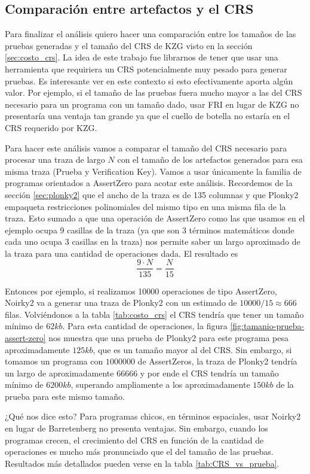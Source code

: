 \documentclass[11pt,a4paper]{tesis}
\begin{document}
\subsection{Comparación entre artefactos y el CRS}
Para finalizar el análisis quiero hacer una comparación entre los tamaños de las pruebas generadas y el tamaño del CRS de KZG visto en la sección \ref{sec:costo_crs}. La idea de este trabajo fue librarnos de tener que usar una herramienta que requiriera un CRS potencialmente muy pesado para generar pruebas. Es interesante ver en este contexto si esto efectivamente aporta algún valor. Por ejemplo, si el tamaño de las pruebas fuera mucho mayor a las del CRS necesario para un programa con un tamaño dado, usar FRI en lugar de KZG no presentaría una ventaja tan grande ya que el cuello de botella no estaría en el CRS requerido por KZG. 

Para hacer este análisis vamos a comparar el tamaño del CRS necesario para procesar una traza de largo $N$ con el tamaño de los artefactos generados para esa misma traza (Prueba y Verification Key). Vamos a usar únicamente la familia de programas orientados a AssertZero para acotar este análisis. Recordemos de la sección \ref{sec:plonky2} que el ancho de la traza es de 135 columnas y que Plonky2 empaqueta restricciones polinomiales del mismo tipo en una misma fila de la traza. Esto sumado a que una operación de AssertZero como las que usamos en el ejemplo ocupa 9 casillas de la traza (ya que son 3 términos matemáticos donde cada uno ocupa 3 casillas en la traza) nos permite saber un largo aproximado de la traza para una cantidad de operaciones dada. El resultado es 
$$\frac{9\cdot N}{135} = \frac{N}{15} $$

Entonces por ejemplo, si realizamos 10000 operaciones de tipo AssertZero, Noirky2 va a generar una traza de Plonky2 con un estimado de $10000/15 \approx 666$ filas. Volviéndonos a la tabla \ref{tab:costo_crs} el CRS tendría que tener un tamaño mínimo de $62kb$. Para esta cantidad de operaciones, la figura \ref{fig:tamanio-prueba-assert-zero} nos muestra que una prueba de Plonky2 para este programa pesa aproximadamente $125kb$, que es un tamaño mayor al del CRS. Sin embargo, si tomamos un programa con $1000000$ de AssertZeros, la traza de Plonky2 tendría un largo de aproximadamente $66666$ y por ende el CRS tendría un tamaño mínimo de $6200kb$, superando ampliamente a los aproximadamente $150kb$ de la prueba para este mismo tamaño.

¿Qué nos dice esto? Para programas chicos, en términos espaciales, usar Noirky2 en lugar de Barretenberg no presenta ventajas. Sin embargo, cuando los programas crecen, el crecimiento del CRS en función de la cantidad de operaciones es mucho más pronunciado que el del tamaño de las pruebas. Resultados más detallados pueden verse en la tabla \ref{tab:CRS_vs_prueba}.
\end{document}
